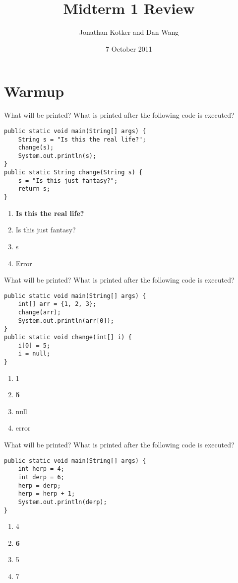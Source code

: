 \documentclass[9pt]{beamer}
\title[Midterm 1 Review]{Midterm 1 Review}
\author{Jonathan Kotker and Dan Wang}
\institute{University of California, Berkeley}
\date{7 October 2011}
\begin{document}
\begin{frame}
  \titlepage
\end{frame}

\section{Warmup}
\begin{frame}[fragile]{What will be printed?}
  What is printed after the following code is executed?
  \begin{lstlisting}
public static void main(String[] args) {
    String s = "Is this the real life?";
    change(s);
    System.out.println(s);
}
public static String change(String s) {
    s = "Is this just fantasy?";
    return s;
}
  \end{lstlisting}
  \begin{enumerate}
    \item
      \textbf<2>{Is this the real life?}
    \item
      Is this just fantasy?
    \item
      s
    \item
      Error
  \end{enumerate}
\end{frame}

\begin{frame}[fragile]{What will be printed?}
  What is printed after the following code is executed?
  \begin{lstlisting}
public static void main(String[] args) {
    int[] arr = {1, 2, 3};
    change(arr);
    System.out.println(arr[0]);
}
public static void change(int[] i) {
    i[0] = 5;
    i = null;
}
  \end{lstlisting}
  \begin{enumerate}
    \item
      1
    \item
      \textbf<2>{5}
    \item
      null
    \item
      error
  \end{enumerate}
\end{frame}

\begin{frame}[fragile]{What will be printed?}
  What is printed after the following code is executed?
  \begin{lstlisting}
public static void main(String[] args) {
    int herp = 4;
    int derp = 6;
    herp = derp;
    herp = herp + 1;
    System.out.println(derp);
}
  \end{lstlisting}
  \begin{enumerate}
    \item
      4
    \item
      \textbf<2>{6}
    \item
      5
    \item
      7
  \end{enumerate}
\end{frame}
\end{document}
